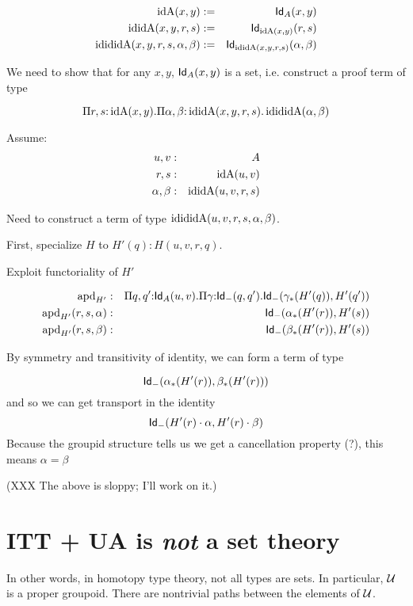\documentclass[11pt]{article}
\begin{document}
\newcommand{\idA}{\op{idA}}
\newcommand{\ididA}{\op{ididA}}
\newcommand{\idididA}{\op{idididA}}
\begin{eqnarray*}
\op{idA}(x,y) &:=& \Id{A}(x,y)\\
\op{ididA}(x,y,r,s) &:=& \Id{\idA(x,y)}(r,s) \\
\op{idididA}(x,y,r,s,\alpha,\beta) &:=& \Id{\ididA(x,y,r,s)}(\alpha,\beta)
\end{eqnarray*}

We need to show that for any $x,y$, 
$\mathsf{Id}_{A}(x,y)$ is a set, i.e. construct a proof term of type

\[
\Pi{r,s}{:}\idA(x,y).\Pi{\alpha,\beta}{:}\ididA(x,y,r,s).
\idididA(\alpha,\beta)
\]

Assume:
\begin{eqnarray*}
u,v &:& A\\
r,s &:& \idA(u,v)\\
\alpha,\beta &:& \ididA(u,v,r,s)
\end{eqnarray*}

Need to construct a term of type $\idididA(u,v,r,s,\alpha,\beta)$.

First, specialize $H$ to $H'(q) : H(u,v,r,q)$.

Exploit functoriality of $H'$

\begin{eqnarray*}
\operatorname{apd}_{H'} &:& \Pi{q,q'}{:}\mathsf{Id}_{A}(u,v).
                \Pi{\gamma}{:}\mathsf{Id}_{-}(q,q').
                  \mathsf{Id}_{-}(\gamma_{*}(H'(q)), H'(q'))\\
\operatorname{apd}_{H'}(r,s,\alpha) &:& \mathsf{Id}_{-}(\alpha_{*}(H'(r)), H'(s))\\
\operatorname{apd}_{H'}(r,s,\beta) &:& \mathsf{Id}_{-}(\beta_*{}(H'(r)), H'(s))
\end{eqnarray*}

By symmetry and transitivity of identity, we can form a term of type

\[
\mathsf{Id}_{-}(\alpha_*(H'(r)), \beta_*(H'(r)))
\]
and so we can get transport in the identity
\[
\mathsf{Id}_{-}(H'(r)\cdot \alpha, H'(r)\cdot\beta)
\]
Because the groupid structure tells us we get a cancellation property (?),
this means $\alpha = \beta$

(XXX The above is sloppy; I'll work on it.)

\section{ITT + UA is {\em not} a set theory}

In other words, in homotopy type theory, not all types are sets. In
particular, $\mathcal{U}$ is a proper groupoid. There are nontrivial paths
between the elements of $\mathcal{U}$.
\end{document}
